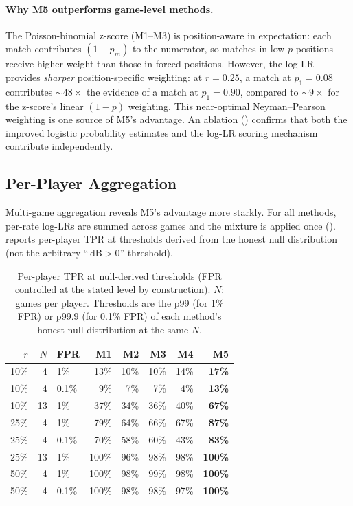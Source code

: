 \documentclass[11pt,a4paper]{article}
\newcommand{\dB}{\,\mathrm{dB}}
\theoremstyle{definition}
\begin{document}
\paragraph{Why M5 outperforms game-level methods.}
The Poisson-binomial z-score (M1--M3) is position-aware in expectation:
each match contributes $(1 - p_m)$ to the numerator, so matches in
low-$p$ positions receive higher weight than those in forced positions.
However, the log-LR provides \emph{sharper} position-specific weighting:
at $r = 0.25$, a match at $p_1 = 0.08$ contributes ${\sim}48\times$
the evidence of a match at $p_1 = 0.90$, compared to ${\sim}9\times$
for the z-score's linear $(1-p)$ weighting.  This near-optimal
Neyman--Pearson weighting is one source of M5's advantage.  An ablation
() confirms that both the improved logistic
probability estimates and the log-LR scoring mechanism contribute
independently.


\subsection{Per-Player Aggregation}
\label{sec:synth-agg}

Multi-game aggregation reveals M5's advantage more starkly.
For all methods, per-rate log-LRs are summed across games and the
mixture is applied once ().  
reports per-player TPR at thresholds derived from the honest null
distribution (not the arbitrary ``$\dB > 0$'' threshold).

\begin{table}[t]
  \centering
  \caption{Per-player TPR at null-derived thresholds (FPR controlled
    at the stated level by construction).  $N$: games per player.
    Thresholds are the p99 (for 1\% FPR) or p99.9 (for 0.1\% FPR) of
    each method's honest null distribution at the same $N$.}
  \label{tab:perplayer}
  \smallskip
  \small
  \begin{tabular}{@{}rrlrrrrr@{}}
    \toprule
    $r$ & $N$ & FPR & M1 & M2 & M3 & M4 & M5 \\
    \midrule
    10\% &  4 & 1\%   & 13\% & 10\% & 10\% & 14\% & \textbf{17\%} \\
    10\% &  4 & 0.1\% &  9\% &  7\% &  7\% &  4\% & \textbf{13\%} \\
    10\% & 13 & 1\%   & 37\% & 34\% & 36\% & 40\% & \textbf{67\%} \\
    \midrule
    25\% &  4 & 1\%   & 79\% & 64\% & 66\% & 67\% & \textbf{87\%} \\
    25\% &  4 & 0.1\% & 70\% & 58\% & 60\% & 43\% & \textbf{83\%} \\
    25\% & 13 & 1\%   & 100\% & 96\% & 98\% & 98\% & \textbf{100\%} \\
    \midrule
    50\% &  4 & 1\%   & 100\% & 98\% & 99\% & 98\% & \textbf{100\%} \\
    50\% &  4 & 0.1\% & 100\% & 98\% & 98\% & 97\% & \textbf{100\%} \\
    \bottomrule
  \end{tabular}
\end{table}
\end{document}
